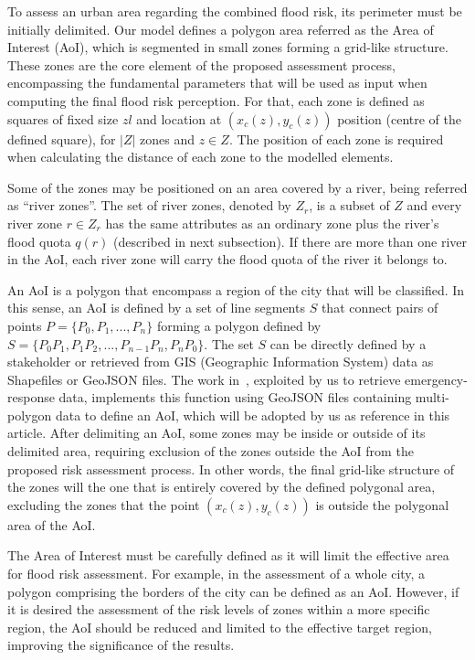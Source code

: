 \begin{refsection}
To assess an urban area regarding the combined flood risk, its perimeter must be initially delimited. Our model defines a polygon area referred as the Area of Interest (AoI), which is segmented in small zones forming a grid-like structure. These zones are the core element of the proposed assessment process, encompassing the fundamental parameters that will be used as input when computing the final flood risk perception. For that, each zone is defined as squares of fixed size $zl$ and location at $(x_c(z), y_c(z))$ position (centre of the defined square), for $|Z|$ zones and $z \in Z$. The position of each zone is required when calculating the distance of each zone to the modelled elements.

Some of the zones may be positioned on an area covered by a river, being referred as ``river zones''. The set of river zones, denoted by $Z_r$, is a subset of $Z$ and every river zone $r \in Z_r$ has the same attributes as an ordinary zone plus the river's flood quota $q(r)$ (described in next subsection). If there are more than one river in the AoI, each river zone will carry the flood quota of the river it belongs to.

An AoI is a polygon that encompass a region of the city that will be classified. In this sense, an AoI is defined by a set of line segments $S$ that connect pairs of points $P = \{P_0, P_1, ..., P_n\}$ forming a polygon defined by $S = \{P_0P_1, P_1P_2, ..., P_{n-1}P_n, P_nP_0\}$. The set $S$ can be directly defined by a stakeholder or retrieved from GIS (Geographic Information System) data as Shapefiles or GeoJSON files. The work in~\cite{cityzones}, exploited by us to retrieve emergency-response data, implements this function using GeoJSON files containing multi-polygon data to define an AoI, which will be adopted by us as reference in this article. After delimiting an AoI, some zones may be inside or outside of its delimited area, requiring exclusion of the zones outside the AoI from the proposed risk assessment process. In other words, the final grid-like structure of the zones will the one that is entirely covered by the defined polygonal area, excluding the zones that the point $(x_c(z), y_c(z))$ is outside the polygonal area of the AoI.

The Area of Interest must be carefully defined as it will limit the effective area for flood risk assessment. For example, in the assessment of a whole city, a polygon comprising the borders of the city can be defined as an AoI. However, if it is desired the assessment of the risk levels of zones within a more specific region, the AoI should be reduced and limited to the effective target region, improving the significance of the results.


\end{refsection}
